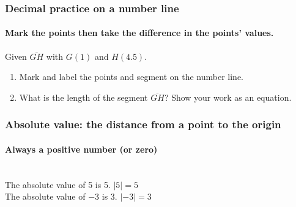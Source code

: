 \documentclass{beamer}
\begin{document}
\frame
{
  \frametitle{Decimal practice on a number line}
  \framesubtitle{Mark the points then take the difference in the points' values.}
  Given $\overline{GH}$ with $G(1)$ and $H(4.5)$. \\[1.5cm]
    \begin{enumerate}
      \item Mark and label the points and segment on the number line.
      \item What is the length of the segment $\overline{GH}$? Show your work as an equation.
    \end{enumerate} \vspace{2cm}  
}

\frame
{
  \frametitle{Absolute value: the distance from a point to the origin}
  \framesubtitle{Always a positive number (or zero)}
     \\[0.5cm]
    The absolute value of 5 is 5. $|5|=5$ \\[0.5cm]
    The absolute value of $-3$ is 3. $|-3|=3$
}
\end{document}
